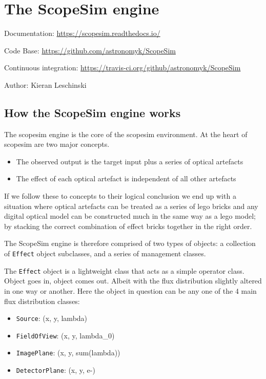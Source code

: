 

\section{The ScopeSim engine%
  \label{the-scopesim-engine}%
}

Documentation: \url{https://scopesim.readthedocs.io/}

Code Base: \url{https://github.com/astronomyk/ScopeSim}

Continuous integration: \url{https://travis-ci.org/github/astronomyk/ScopeSim}

Author: Kieran Leschinski


\subsection{How the ScopeSim engine works%
  \label{how-the-scopesim-engine-works}%
}

The scopesim engine is the core of the scopesim environment.
At the heart of scopesim are two major concepts.

\begin{itemize}
\item The observed output is the target input plus a series of optical artefacts

\item The effect of each optical artefact is independent of all other artefacts
\end{itemize}

If we follow these to concepts to their logical conclusion we end up with a situation where optical artefacts can be treated as a series of \textquotedbl{}lego bricks\textquotedbl{} and any digital optical model can be constructed much in the same way as a lego model; by stacking the correct combination of effect \textquotedbl{}bricks\textquotedbl{} together in the right order.

The ScopeSim engine is therefore comprised of two types of objects: a collection of \texttt{Effect} object subclasses, and a series of \textquotedbl{}management\textquotedbl{} classes.

The \texttt{Effect} object is a lightweight class that acts as a simple operator class.
Object goes in, object comes out.
Albeit with the flux distribution slightly altered in one way or another.
Here the object in question can be any one of the 4 main flux distribution classes:

\begin{itemize}
\item \texttt{Source}: (x, y, lambda)

\item \texttt{FieldOfView}: (x, y, lambda\_0)

\item \texttt{ImagePlane}: (x, y, sum(lambda))

\item \texttt{DetectorPlane}: (x, y, e-)
\end{itemize}

